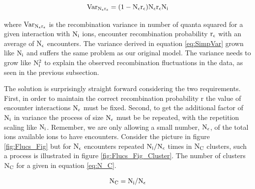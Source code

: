 \begin{equation}
\rm Var_{N_\epsilon r_\epsilon} = (1-N_\epsilon r_\epsilon)N_\epsilon r_\epsilon N_i
\label{eq:SimpVar}
\end{equation}

\noindent where $\rm Var_{N_\epsilon r_\epsilon} $ is the recombination variance in number of quanta squared for a given interaction with $\rm N_i$ ions, encounter recombination probability $\rm r_\epsilon$ with an average of $\rm N_\epsilon$ encounters. The variance derived in equation \ref{eq:SimpVar} grown like $\rm N_i$ and suffers the same problem as our original model. The variance needs to grow like $\rm N_i^2$ to explain the observed recombination fluctuations in the data, as seen in the previous subsection. 

The solution is surprisingly straight forward considering the two requirements. First, in order to maintain the correct recombination probability r the value of  encounter interactions $\rm N_\epsilon$ must be fixed. Second, to get the additional factor of $\rm N_i$ in variance the process of size  $\rm N_\epsilon$ must be be repeated, with the repetition scaling like $\rm N_i$. Remember, we are only allowing a small number, $\rm N_\epsilon$, of the total ions available ions to have encounters. Consider the picture in figure \ref{fig:Flucs_Fig} but for $\rm N_\epsilon$ encounters repeated $\rm N_i/N_\epsilon$ times in $\rm N_C$ clusters, such a process is illustrated in figure \ref{fig:Flucs_Fig_Cluster}. The number of clusters $\rm N_C$ for a given in equation \ref{eq:N_C}. 

\begin{equation}
\rm N_C = N_i/N_\epsilon
\label{eq:N_C}
\end{equation}


